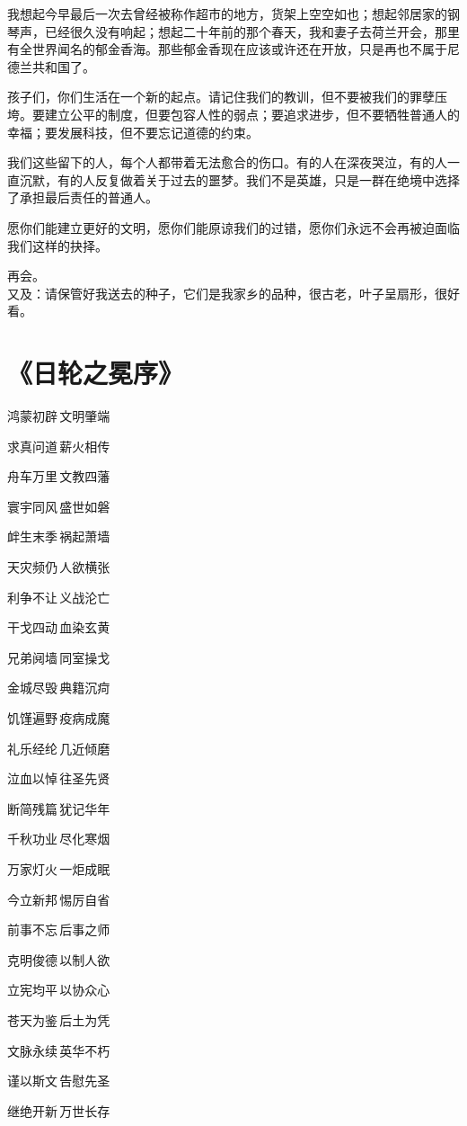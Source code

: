 我想起今早最后一次去曾经被称作超市的地方，货架上空空如也；想起邻居家的钢琴声，已经很久没有响起；想起二十年前的那个春天，我和妻子去荷兰开会，那里有全世界闻名的郁金香海。那些郁金香现在应该或许还在开放，只是再也不属于尼德兰共和国了。

孩子们，你们生活在一个新的起点。请记住我们的教训，但不要被我们的罪孽压垮。要建立公平的制度，但要包容人性的弱点；要追求进步，但不要牺牲普通人的幸福；要发展科技，但不要忘记道德的约束。

我们这些留下的人，每个人都带着无法愈合的伤口。有的人在深夜哭泣，有的人一直沉默，有的人反复做着关于过去的噩梦。我们不是英雄，只是一群在绝境中选择了承担最后责任的普通人。

愿你们能建立更好的文明，愿你们能原谅我们的过错，愿你们永远不会再被迫面临我们这样的抉择。

再会。\\


又及：请保管好我送去的种子，它们是我家乡的品种，很古老，叶子呈扇形，很好看。


\newpage

\section{《日轮之冕序》}\label{ux65e5ux8f6eux4e4bux5195ux5e8f}

\begin{center}
鸿蒙初辟\,文明肇端

求真问道\,薪火相传

舟车万里\,文教四藩

寰宇同风\,盛世如磐

衅生末季\,祸起萧墙

天灾频仍\,人欲横张

利争不让\,义战沦亡

干戈四动\,血染玄黄

兄弟阋墙\,同室操戈

金城尽毁\,典籍沉疴

饥馑遍野\,疫病成魔

礼乐经纶\,几近倾磨

泣血以悼\,往圣先贤

断简残篇\,犹记华年

千秋功业\,尽化寒烟

万家灯火\,一炬成眠

今立新邦\,惕厉自省

前事不忘\,后事之师

克明俊德\,以制人欲

立宪均平\,以协众心

苍天为鉴\,后土为凭

文脉永续\,英华不朽

谨以斯文\,告慰先圣

继绝开新\,万世长存
\end{center}

